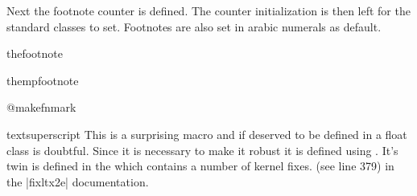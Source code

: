 Next the footnote counter is defined. The counter initialization is then left for the standard
classes to set. Footnotes are also set in arabic numerals as default.

 \begin{docCommand}{thefootnote}{}
    \begin{teX}
\def\thefootnote{\@arabic\c@footnote}
    \end{teX}
 \end{docCommand}

 \begin{docCommand}{thempfootnote}{}
    \begin{teX}
\def\thempfootnote{{\itshape\@alph\c@mpfootnote}}
    \end{teX}
 \end{docCommand}
%
 \begin{docCommand}{@makefnmark}{}
    \begin{teX}
\def\@makefnmark{\hbox{\@textsuperscript{\normalfont\@thefnmark}}}
    \end{teX}
 \end{docCommand}
%

 \begin{docCommand}{textsuperscript} {}
This is a surprising macro and if \CMDI{\textsuperscript} deserved to be defined
in a float class is doubtful. Since it is necessary to make it robust it
is defined using . It’s twin is defined in the
 which contains a number of kernel fixes. (see line 379) in the |fixltx2e| 
documentation. 
%
    \begin{teX}
\DeclareRobustCommand*\textsuperscript[1]{%
  \@textsuperscript{\selectfont#1}}
    \end{teX}
  \end{docCommand}

